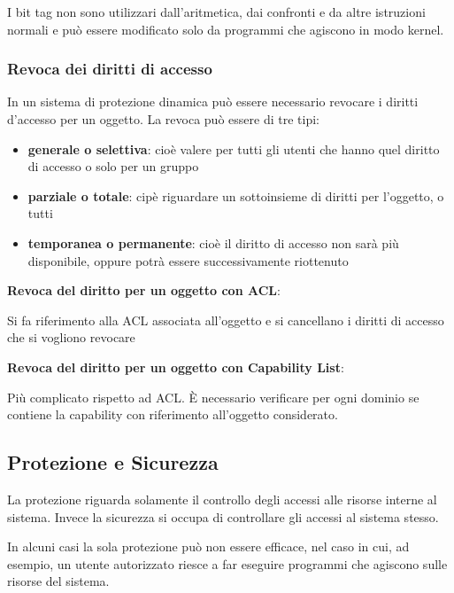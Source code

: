 \documentclass{article}
\begin{document}
\vspace{3mm}
I bit tag non sono utilizzari dall'aritmetica, dai confronti e da altre istruzioni normali e può essere modificato solo da programmi che agiscono in modo kernel.

\vspace{3mm}
\subsubsection{Revoca dei diritti di accesso}

In un sistema di protezione dinamica può essere necessario revocare i diritti d'accesso per un oggetto. La revoca può essere di tre tipi:
\begin{itemize}
    \item \textbf{generale o selettiva}: cioè valere per tutti gli utenti che hanno quel diritto di accesso o solo per un gruppo
    \item \textbf{parziale o totale}: cipè riguardare un sottoinsieme di diritti per l'oggetto, o tutti
    \item \textbf{temporanea o permanente}: cioè il diritto di accesso non sarà più disponibile, oppure potrà essere successivamente riottenuto
\end{itemize}

\vspace{3mm}
\textbf{Revoca del diritto per un oggetto con ACL}:

Si fa riferimento alla ACL associata all'oggetto e si cancellano i diritti di accesso che si vogliono revocare

\vspace{3mm}
\textbf{Revoca del diritto per un oggetto con Capability List}:

Più complicato rispetto ad ACL. È necessario verificare per ogni dominio se contiene la capability con riferimento all'oggetto considerato.

\subsection{Protezione e Sicurezza}

La protezione riguarda solamente il controllo degli accessi alle risorse interne al sistema. Invece la sicurezza si occupa di controllare gli accessi al sistema stesso.

In alcuni casi la sola protezione può non essere efficace, nel caso in cui, ad esempio, un utente autorizzato riesce a far eseguire programmi che agiscono sulle
risorse del sistema.
\end{document}
